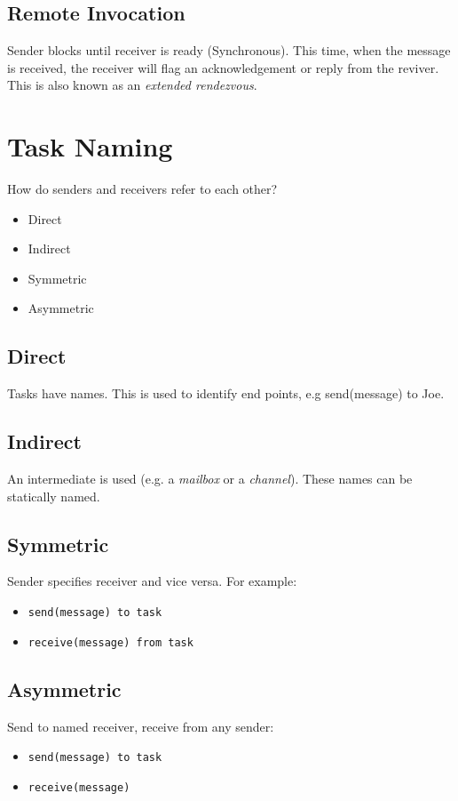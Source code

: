 \documentclass[11pt]{article}
\begin{document}
\subsection{Remote Invocation}
\label{sec:org71f589c}
Sender blocks until receiver is ready (Synchronous).
This time, when the message is received, the receiver will flag an acknowledgement or reply from the reviver.
This is also known as an \emph{extended rendezvous}.

\section{Task Naming}
\label{sec:org6515bf2}
How do senders and receivers refer to each other?
\begin{itemize}
\item Direct
\item Indirect
\item Symmetric
\item Asymmetric
\end{itemize}
\subsection{Direct}
\label{sec:orgdb9523f}
Tasks have names.
This is used to identify end points, e.g send(message) to Joe.
\subsection{Indirect}
\label{sec:org8516f61}
An intermediate is used (e.g. a \emph{mailbox} or a \emph{channel}).
These names can be statically named.
\subsection{Symmetric}
\label{sec:org48df0a6}
Sender specifies receiver and vice versa.
For example:
\begin{itemize}
\item \texttt{send(message) to task}
\item \texttt{receive(message) from task}
\end{itemize}
\subsection{Asymmetric}
\label{sec:orgbd3a5d0}
Send to named receiver, receive from any sender:
\begin{itemize}
\item \texttt{send(message) to task}
\item \texttt{receive(message)}
\end{itemize}
\end{document}

